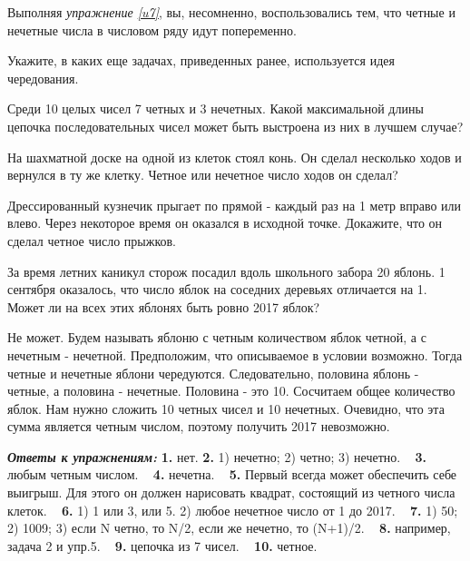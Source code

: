Выполняя \textit{упражнение \ref{u7}}, вы, несомненно, воспользовались тем, что четные и нечетные числа в числовом ряду идут попеременно.  

\begin{ex}
	Укажите, в каких еще задачах, приведенных ранее, используется идея чередования. 
\end{ex}

\begin{ex}
	Среди 10 целых чисел 7 четных и 3 нечетных. Какой максимальной длины цепочка последовательных чисел может быть выстроена из них в лучшем случае?
\end{ex}

\begin{ex}
	На шахматной доске на одной из клеток стоял конь. Он сделал несколько ходов и вернулся в ту же клетку. Четное или нечетное число ходов он сделал?
\end{ex}

\begin{ex}
	Дрессированный кузнечик прыгает по прямой - каждый раз на 1 метр вправо или влево. Через некоторое время он оказался в исходной точке. Докажите, что он сделал четное число прыжков.
\end{ex}

\begin{thm}
	За время летних каникул сторож посадил вдоль школьного забора 20 яблонь. 1 сентября оказалось, что число яблок на соседних деревьях отличается на 1. Может ли на всех этих яблонях быть ровно 2017 яблок?
\end{thm}

\begin{prf}
	Не может. Будем называть яблоню с четным количеством яблок четной, а с нечетным - нечетной. Предположим, что описываемое в условии возможно. Тогда четные и нечетные яблони чередуются. Следовательно, половина яблонь - четные, а половина - нечетные. Половина - это 10. Сосчитаем общее количество яблок. Нам нужно сложить 10 четных чисел и 10 нечетных. Очевидно, что эта сумма является четным числом, поэтому получить 2017 невозможно.    
\end{prf}

\textbf{\textit{Ответы к упражнениям:}}
\textbf{1.} нет. 
\textbf{2.} 1) нечетно; 2) четно; 3) нечетно. ~
\textbf{3.} любым четным числом. ~
\textbf{4.} нечетна. ~
\textbf{5.} Первый всегда может обеспечить себе выигрыш. Для этого он должен нарисовать квадрат, состоящий из четного числа клеток. ~
\textbf{6.} 1) 1 или 3, или 5. 2) любое нечетное число от 1 до 2017. ~
\textbf{7.} 1) 50; 2) 1009; 3) если N четно, то N/2, если же нечетно, то (N+1)/2. ~
\textbf{8.} например, задача 2 и упр.5. ~
\textbf{9.} цепочка из 7 чисел. ~
\textbf{10.} четное. ~